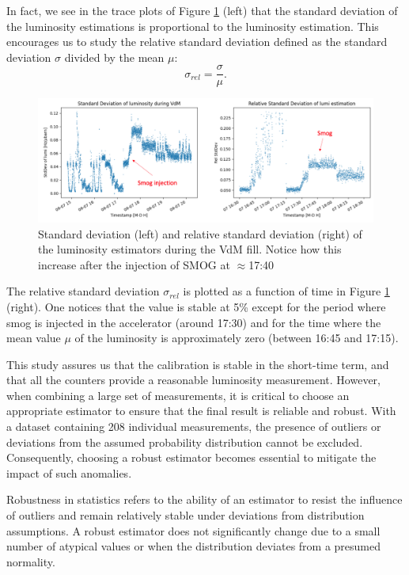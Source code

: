 In fact, we see in the trace plots of Figure \ref{fig:std_dev_rel_std} (left) that the standard deviation of the luminosity estimations is proportional to the luminosity estimation. This encourages us to study the relative standard deviation defined as the standard deviation $\sigma$  divided by the mean $\mu$:
\begin{equation}
    \sigma_{rel} = \frac{\sigma}{\mu} \label{rel_std}.
\end{equation}


\begin{figure}
    \centering
    \includegraphics[width=\textwidth]{figures/std_dev_and_rel_std.png}
    \caption{Standard deviation (left) and relative standard deviation (right) of the luminosity estimators during the VdM fill. Notice how this increase after the injection of SMOG at $\approx$17:40}
    \label{fig:std_dev_rel_std}
\end{figure}


The relative standard deviation $\sigma_{rel}$ is plotted as a function of time in Figure \ref{fig:std_dev_rel_std} (right). One notices that the value is stable at 5\% except for the period where smog is injected in the accelerator (around 17:30) and for the time where the mean value $\mu$ of the luminosity is approximately zero (between 16:45 and 17:15).  

This study assures us that the calibration is stable in the short-time term, and that all the counters provide a reasonable luminosity measurement. However, when combining a large set of measurements, it is critical to choose an appropriate estimator to ensure that the final result is reliable and robust. With a dataset containing 208 individual measurements, the presence of outliers or deviations from the assumed probability distribution cannot be excluded. Consequently, choosing a robust estimator becomes essential to mitigate the impact of such anomalies.

Robustness in statistics refers to the ability of an estimator to resist the influence of outliers and remain relatively stable under deviations from distribution assumptions. A robust estimator does not significantly change due to a small number of atypical values or when the distribution deviates from a presumed normality.

